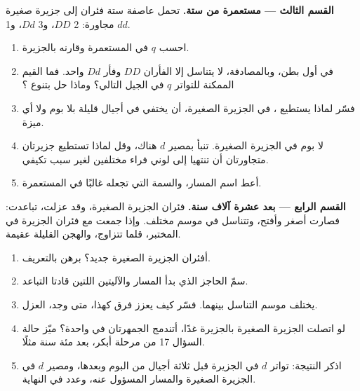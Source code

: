 \begin{problem}
\medskip
\noindent\textbf{القسم الثالث --- مستعمرة من ستة.}
تحمل عاصفة ستة فئران إلى جزيرة صغيرة مجاورة: 2 $DD$، و3 $Dd$، و1 $dd$.
\begin{enumerate}[resume]
  \item احسب $q$ في المستعمرة وقارنه بالجزيرة.
  \item في أول بطن، وبالمصادفة، لا يتناسل إلا الفأران $DD$ وفأر $Dd$
        واحد. فما القيم الممكنة للتواتر $q$ في الجيل التالي؟ وماذا حل بتنوع
        ؟
  \item فسّر لماذا يستطيع ، في الجزيرة الصغيرة، أن يختفي في أجيال
        قليلة بلا بوم ولا أي ميزة.
  \item لا بوم في الجزيرة الصغيرة. تنبأ بمصير $d$ هناك، وقل لماذا
        تستطيع جزيرتان متجاورتان أن تنتهيا إلى لوني فراء مختلفين لغير
        سبب تكيفي.
  \item أعط اسم المسار، والسمة التي تجعله غالبًا في المستعمرة.
\end{enumerate}

\medskip
\noindent\textbf{القسم الرابع --- بعد عشرة آلاف سنة.}
فئران الجزيرة الصغيرة، وقد عزلت، تباعدت: فصارت أصغر وأفتح، وتتناسل في
موسم مختلف. وإذا جمعت مع فئران الجزيرة في المختبر، قلما تتزاوج، والهجن
القليلة عقيمة.
\begin{enumerate}[resume]
  \item أفئران الجزيرة الصغيرة  جديد؟ برهن بالتعريف.
  \item سمّ الحاجز الذي بدأ المسار والآليتين اللتين قادتا التباعد.
  \item يختلف موسم التناسل بينهما. فسّر كيف يعزز فرق كهذا، متى وجد،
        العزل.
  \item لو اتصلت الجزيرة الصغيرة بالجزيرة غدًا، أتندمج الجمهرتان في
         واحدة؟ ميّز حالة السؤال 17 من مرحلة أبكر، بعد مئة سنة
        مثلًا.
  \item اذكر النتيجة: تواتر $d$ في الجزيرة قبل ثلاثة أجيال من البوم
        وبعدها، ومصير $d$ في الجزيرة الصغيرة والمسار المسؤول عنه، وعدد
         في النهاية.
\end{enumerate}
\end{problem}
